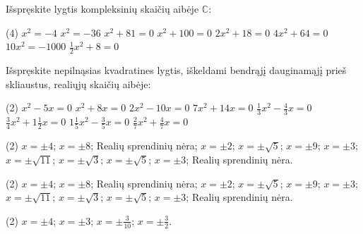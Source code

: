\documentclass[11pt,a4paper]{scrartcl}
\begin{document}
\begin{problem}
Išspręskite lygtis kompleksinių skaičių aibėje $\mathbb{C}$:
\begin{tasks}[label={(\arabic*)}, label-offset=0.9em](4)
    \task $x^2 = -4$
    \task $x^2 = -36$
    \task $x^2+81=0$
    \task $x^2+100=0$
    \task $2x^2+18=0$
    \task $4x^2+64=0$
    \task $10x^2 = -1000$
    \task $\frac{1}{2}x^2+8=0$
\end{tasks}
\end{problem}

\newpage 
\begin{problem}
Išspręskite nepilnąsias kvadratines lygtis, iškeldami bendrąjį dauginamąjį prieš skliaustus, realiųjų skaičių aibėje:
\begin{tasks}[label={(\arabic*)}, label-offset=0.9em](2)
    \task $x^2-5x=0$
    \task $x^2+8x=0$
    \task $2x^2-10x=0$
    \task $7x^2+14x=0$
    \task $\frac{1}{3}x^2 - \frac{4}{3}x = 0$
    \task $\frac{3}{4}x^2 + 1\frac{1}{2}x = 0$
    \task $1\frac{1}{5}x^2 - \frac{3}{5}x = 0$
    \task $\frac{2}{7}x^2 + \frac{4}{7}x = 0$
\end{tasks}
\end{problem}

\newpage
\answerssection

\begin{problem} \phantom{text}
\begin{tasks}[label={(\arabic*)}, label-offset=0.9em](2)
    \task $x=\pm 4$;
    \task $x=\pm 8$;
    \task Realių sprendinių nėra;
    \task $x=\pm 2$;
    \task $x=\pm \sqrt{5}$;
    \task $x=\pm 9$;
    \task $x=\pm 3$;
    \task $x=\pm \sqrt{11}$;
    \task $x=\pm \sqrt{3}$;
    \task $x=\pm \sqrt{5}$;
    \task $x=\pm 3$;
    \task Realių sprendinių nėra.
\end{tasks}
\end{problem}

\begin{problem} \phantom{text}
\begin{tasks}[label={(\arabic*)}, label-offset=0.9em](2)
    \task $x=\pm 4$;
    \task $x=\pm 8$;
    \task Realių sprendinių nėra;
    \task $x=\pm 2$;
    \task $x=\pm \sqrt{5}$;
    \task $x=\pm 9$;
    \task $x=\pm 3$;
    \task $x=\pm \sqrt{11}$;
    \task $x=\pm \sqrt{3}$;
    \task $x=\pm \sqrt{5}$;
    \task $x=\pm 3$;
    \task Realių sprendinių nėra.
\end{tasks}
\end{problem}

\begin{problem} \phantom{text}
\begin{tasks}[label={(\arabic*)}, label-offset=0.9em](2)
    \task $x=\pm 4$;
    \task $x=\pm 3$;
    \task $x=\pm \frac{3}{10}$;
    \task $x=\pm \frac{3}{2}$.
\end{tasks}
\end{problem}
\end{document}
